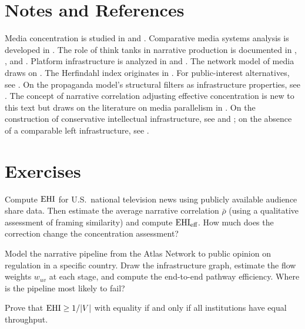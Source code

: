 \section{Notes and References}
\label{sec:ch7-notes}

Media concentration is studied in \textcite{bagdikian2004} and \textcite{mcchesney1999}.
Comparative media systems analysis is developed in \textcite{hallin2004}.
The role of think tanks in narrative production is documented in \textcite{mayer2016}, \textcite{mirowski2009}, and \textcite{phillipsfein2009}.
Platform infrastructure is analyzed in \textcite{zuboff2019} and \textcite{benkler2018}.
The network model of media draws on \textcite{jackson2008}.
The Herfindahl index originates in \textcite{herfindahl1950}.
For public-interest alternatives, see \textcite{benkler2006}.
On the propaganda model's structural filters as infrastructure properties, see \textcite{herman1988}.
The concept of narrative correlation adjusting effective concentration is new to this text but draws on the literature on media parallelism in \textcite{hallin2004}.
On the construction of conservative intellectual infrastructure, see \textcite{mayer2016} and \textcite{phillipsfein2009}; on the absence of a comparable left infrastructure, see \textcite{mudge2018}.


\section{Exercises}

\begin{exercise}
Compute $\mathrm{EHI}$ for U.S.\ national television news using publicly available audience share data.
Then estimate the average narrative correlation $\bar{\rho}$ (using a qualitative assessment of framing similarity) and compute $\mathrm{EHI}_{\text{eff}}$.
How much does the correction change the concentration assessment?
\end{exercise}

\begin{exercise}
Model the narrative pipeline from the Atlas Network to public opinion on regulation in a specific country.
Draw the infrastructure graph, estimate the flow weights $w_{uv}$ at each stage, and compute the end-to-end pathway efficiency.
Where is the pipeline most likely to fail?
\end{exercise}

\begin{exercise}
Prove that $\mathrm{EHI} \geq 1/|V|$ with equality if and only if all institutions have equal throughput.
\end{exercise}

